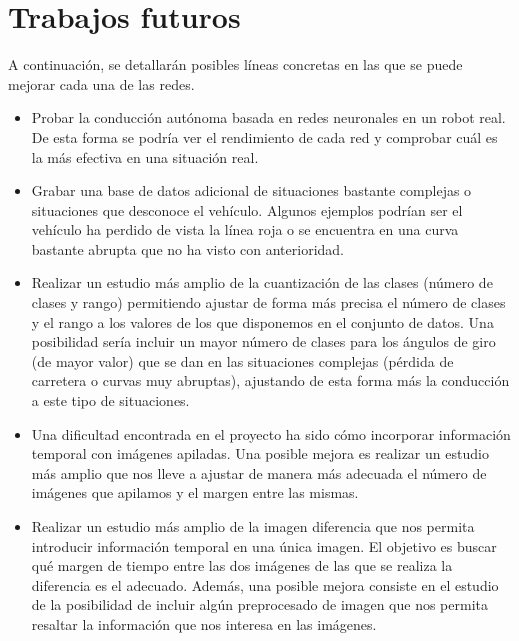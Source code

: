 \section{Trabajos futuros}

A continuación, se detallarán posibles líneas concretas en las que se puede mejorar cada una de las redes.\\

\begin{itemize}

    \item Probar la conducción autónoma basada en redes neuronales en un robot real. De esta forma se podría ver el rendimiento de cada red y comprobar cuál es la más efectiva en una situación real.
    
    \item Grabar una base de datos adicional de situaciones bastante complejas o situaciones que desconoce el vehículo. Algunos ejemplos podrían ser el vehículo ha perdido de vista la línea roja o se encuentra en una curva bastante abrupta que no ha visto con anterioridad. 
    
    \item Realizar un estudio más amplio de la cuantización de las clases (número de clases y rango) permitiendo ajustar de forma más precisa el número de clases y el rango a los valores de los que disponemos en el conjunto de datos. Una posibilidad sería incluir un mayor número de clases para los ángulos de giro (de mayor valor) que se dan en las situaciones complejas (pérdida de carretera o curvas muy abruptas), ajustando de esta  forma más la conducción a este tipo de situaciones.
    
    \item Una dificultad encontrada en el proyecto ha sido cómo incorporar información temporal con imágenes apiladas. Una posible mejora es realizar un estudio más amplio que nos lleve a ajustar de manera más adecuada el número de imágenes que apilamos y el margen entre las mismas.
    
    \item Realizar un estudio más amplio de la imagen diferencia que nos permita introducir información temporal en una única imagen. El objetivo es buscar qué margen de tiempo entre las dos imágenes de las que se realiza la diferencia es el adecuado. Además, una posible mejora consiste en el estudio de la posibilidad de incluir algún preprocesado de imagen que nos permita resaltar la información que nos interesa en las imágenes.
    

\end{itemize}
